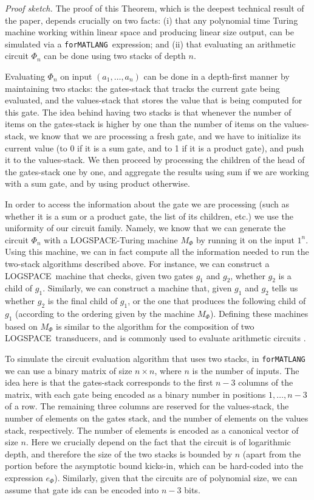 \documentclass[sigconf]{acmart}
\newcommand{\langfor}{\texttt{for}\text{-}\texttt{MATLANG}\xspace}
\newcommand{\logspace}{{\sc LOGSPACE}}
\begin{document}
\textit{Proof sketch.} The proof of this Theorem, which is the deepest technical result of the paper, depends crucially on two facts: (i) that any polynomial time Turing machine working within linear space and producing linear size output, can be simulated via a \langfor\ expression; and (ii) that evaluating an arithmetic circuit $\Phi_n$ can be done using two stacks of  depth $n$.

Evaluating  $\Phi_n$ on input $(a_1,\ldots ,a_n)$ can be done in a depth-first manner by maintaining  two stacks: the gates-stack that tracks the current gate being evaluated, and the values-stack that stores the value that is being computed for this gate. The idea behind having two stacks is that whenever the number of items on the gates-stack is higher by one than the number of items on the values-stack, we know that we are processing a fresh gate, and we have to initialize its current value (to 0 if it is a sum gate, and to 1 if it is a product gate), and push it to the values-stack. We then proceed by processing the children of the head of the gates-stack one by one, and aggregate the results using sum if we are working with a sum gate, and by using product otherwise. 

In order  to access the information about the gate we are processing (such as whether it is a sum or a product gate, the list of its children, etc.) we use the uniformity of our circuit family. Namely, we know that we can generate the circuit $\Phi_n$ with a \logspace-Turing machine $M_\Phi$ by running it on the input $1^n$. Using this machine, we can in fact compute all the information needed to run the two-stack algorithms described above. For instance, we can construct a \logspace\ machine that checks, given two gates $g_1$ and $g_2$, whether $g_2$ is a child of $g_1$. Similarly, we can construct a machine that, given $g_1$ and $g_2$ tells us whether $g_2$ is the final child of $g_1$, or the one that produces the following child of $g_1$ (according to the ordering given by the machine $M_\Phi$). Defining these machines based on $M_\Phi$ is similar to the algorithm for the composition of two \logspace\ transducers, and is commonly used to evaluate arithmetic circuits \citep{allender}. 

To simulate the circuit evaluation algorithm that uses two stacks, in \langfor we can use a binary matrix of size $n\times n$, where $n$ is the number of inputs. The idea here is that  the gates-stack corresponds to the first $n-3$ columns of the matrix, with each gate being encoded as a binary number in positions $1,\ldots,n-3$ of a row. The remaining three columns are reserved for the values-stack, the number of elements on the gates stack, and the number of elements on the values stack, respectively. The number of elements is encoded as a canonical vector of size $n$. Here we crucially depend on the fact that the circuit is of logarithmic depth, and therefore the size of the two stacks is bounded by $n$ (apart from the portion before the asymptotic bound kicks-in, which can be hard-coded into the expression $e_\Phi$). Similarly, given that the circuits are of polynomial size, we can assume that gate ids can be encoded into $n-3$ bits.
\end{document}
